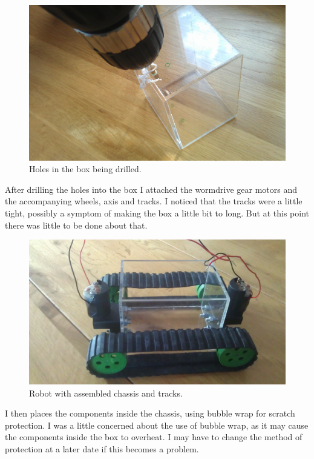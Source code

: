 \documentclass[]{report}   %
\begin{document}
						\begin{figure}[h]
							\caption{Holes in the box being drilled.}
							\includegraphics[width=\textwidth,height=\textheight,keepaspectratio]{images/drilldrilldrill}
						\end{figure}
						
						After drilling the holes into the box I attached the wormdrive gear motors and the accompanying wheels, axis and tracks. I noticed that the tracks were
						a little tight, possibly a symptom of making the box a little bit to long. But at this point there was little to be done about that.
						
						\begin{figure}[h]
							\caption{Robot with assembled chassis and tracks.}
							\includegraphics[width=\textwidth,height=\textheight,keepaspectratio]{images/noinsides}
						\end{figure}
						
						I then places the components inside the chassis, using bubble wrap for scratch protection. I was a little concerned about the use of bubble wrap, as it may
						cause the components inside the box to overheat. I may have to change the method of protection at a later date if this becomes a problem.
						
\end{document}
